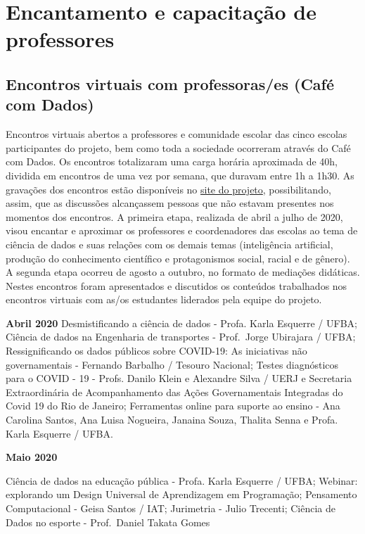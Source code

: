 \documentclass[
]{book}
\begin{document}
\hypertarget{encprof}{%
\chapter{Encantamento e capacitação de professores}\label{encprof}}

\hypertarget{encontros-virtuais-com-professorases-cafuxe9-com-dados}{%
\section{Encontros virtuais com professoras/es (Café com Dados)}\label{encontros-virtuais-com-professorases-cafuxe9-com-dados}}

Encontros virtuais abertos a professores e comunidade escolar das cinco escolas participantes do projeto, bem como toda a sociedade ocorreram através do Café com Dados. Os encontros totalizaram uma carga horária aproximada de 40h, dividida em encontros de uma vez por semana, que duravam entre 1h a 1h30. As gravações dos encontros estão disponíveis no \href{https://cienciadedadosep.wixsite.com/cafecomdados}{site do projeto}, possibilitando, assim, que as discussões alcançassem pessoas que não estavam presentes nos momentos dos encontros. A primeira etapa, realizada de abril a julho de 2020, visou encantar e aproximar os professores e coordenadores das escolas ao tema de ciência de dados e suas relações com os demais temas (inteligência artificial, produção do conhecimento científico e protagonismos social, racial e de gênero). A segunda etapa ocorreu de agosto a outubro, no formato de mediações didáticas. Nestes encontros foram apresentados e discutidos os conteúdos trabalhados nos encontros virtuais com as/os estudantes liderados pela equipe do projeto.

\textbf{Abril 2020}
Desmistificando a ciência de dados - Profa. Karla Esquerre / UFBA; Ciência de dados na Engenharia de transportes - Prof.~Jorge Ubirajara / UFBA; Ressignificando os dados públicos sobre COVID-19: As iniciativas não governamentais - Fernando Barbalho / Tesouro Nacional; Testes diagnósticos para o COVID - 19 - Profs. Danilo Klein e Alexandre Silva / UERJ e Secretaria Extraordinária de Acompanhamento das Ações Governamentais Integradas do Covid 19 do Rio de Janeiro; Ferramentas online para suporte ao ensino - Ana Carolina Santos, Ana Luisa Nogueira, Janaina Souza, Thalita Senna e Profa. Karla Esquerre / UFBA.

\textbf{Maio 2020}

Ciência de dados na educação pública - Profa. Karla Esquerre / UFBA; Webinar: explorando um Design Universal de Aprendizagem em Programação; Pensamento Computacional - Geisa Santos / IAT; Jurimetria - Julio Trecenti; Ciência de Dados no esporte - Prof.~Daniel Takata Gomes
\end{document}
